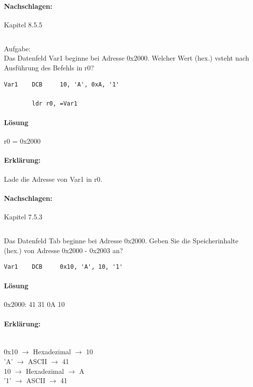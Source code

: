 \documentclass[12pt,twoside,a4paper]{article}
\begin{document}
\paragraph*{Nachschlagen:}
Kapitel 8.5.5

\subsection{}
Aufgabe:\\
Das Datenfeld Var1 beginne bei Adresse 0x2000. Welcher Wert (hex.) vsteht nach Ausführung des Befehls in r0?\\

\begin{lstlisting}
Var1 	DCB 	10, 'A', 0xA, '1'

		ldr r0, =Var1
\end{lstlisting}

\paragraph*{Lösung}
r0 = 0x2000

\paragraph*{Erklärung:}
Lade die Adresse von Var1 in r0. 


\paragraph*{Nachschlagen:}
Kapitel 7.5.3

\subsection{}
Das Datenfeld Tab beginne bei Adresse 0x2000. Geben Sie die Speicherinhalte (hex.) von Adresse 0x2000 - 0x2003 an?\\
\begin{lstlisting}
Var1 	DCB 	0x10, 'A', 10, '1'
\end{lstlisting}

\paragraph*{Lösung}
0x2000: 41 31 0A 10 \\


\paragraph*{Erklärung:}
\\
0x10 $\rightarrow$ Hexadezimal $\rightarrow$ 10\\
'A' $\rightarrow$ ASCII $\rightarrow$ 41\\
10 $\rightarrow$ Hexadezimal $\rightarrow$ A\\
'1' $\rightarrow$ ASCII $\rightarrow$ 41\\
\end{document}
